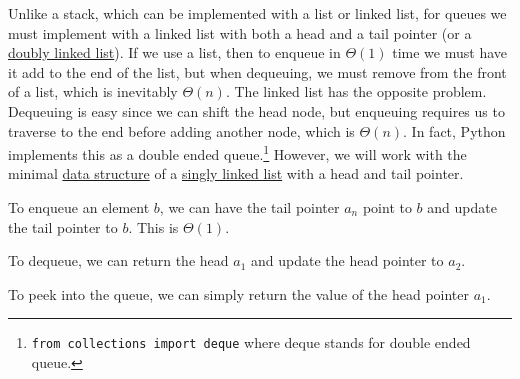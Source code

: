   Unlike a stack, which can be implemented with a list or linked list, for queues we must implement with a linked list with both a head and a tail pointer (or a \hyperref[def:doubly-linked-list]{doubly linked list}). If we use a list, then to enqueue in $\Theta(1)$ time we must have it add to the end of the list, but when dequeuing, we must remove from the front of a list, which is inevitably $\Theta(n)$. The linked list has the opposite problem. Dequeuing is easy since we can shift the head node, but enqueuing requires us to traverse to the end before adding another node, which is $\Theta(n)$. In fact, Python implements this as a double ended queue.\footnote{\texttt{from collections import deque} where deque stands for double ended queue.} However, we will work with the minimal \hyperref[def:data-structure]{data structure} of a \hyperref[def:singly-linked-list]{singly linked list} with a head and tail pointer. 

  \begin{algo}
    To enqueue an element $b$, we can have the tail pointer $a_n$ point to $b$ and update the tail pointer to $b$. This is $\Theta(1)$. 
  \end{algo}

  \begin{algo}
    To dequeue, we can return the head $a_1$ and update the head pointer to $a_2$.  
  \end{algo}

  \begin{algo}
    To peek into the queue, we can simply return the value of the head pointer $a_1$. 
  \end{algo}

